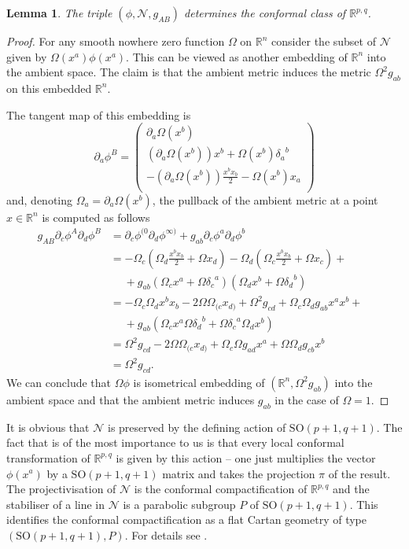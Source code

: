 \documentclass[final]{birkmult}
\newtheorem{lemma}[theorem]{Lemma}
\theoremstyle{definition}
\theoremstyle{remark}
\numberwithin{equation}{section}
\newcommand{\p}[1]{\partial_{#1}}
\newcommand{\R}{\mathbb{R}^{p,q}}
\newcommand{\aSO}{\mathrm{SO}(p+1,q+1)}
\begin{document}
  \begin{lemma}
    The triple $(\phi,\mathcal{N},g_{AB})$ determines the conformal class of $\R$.
   \end{lemma}
  \begin{proof}
    For any smooth nowhere zero function $\Omega$ on $\mathbb{R}^n$ consider the subset of $\mathcal{N}$ given by $\Omega(x^a)\phi(x^a)$. This can be viewed as another embedding of $\mathbb{R}^n$ into the ambient space. The claim is that the ambient metric induces the metric $\Omega^2g_{ab}$ on this embedded $\mathbb{R}^n$.

    The tangent map of this embedding is
    \[
      \partial_a \phi^B = \begin{pmatrix} \partial_a \Omega(x^b)\\(\partial_a \Omega(x^b))x^b + \Omega(x^b){\delta_a}^b\\ -(\partial_a\Omega(x^b))\frac{x^bx_b}{2} - \Omega(x^b)x_a\\ \end{pmatrix}
    \]
    and, denoting $\Omega_a=\p{a}\Omega(x^b)$, the pullback of the ambient metric at a point $x\in \mathbb{R}^n$ is computed as follows
    \begin{align*}
	    g_{AB}\partial_c \phi^A \partial_d \phi^B & = \partial_c \phi^{(0}\partial_d \phi^{\infty)} + g_{ab} \partial_c \phi^a \partial_d \phi^b&\\
						      & = -\Omega_c(\Omega_d \tfrac{x^bx_b}{2} + \Omega x_d) - \Omega_d(\Omega_c \tfrac{x^bx_b}{2} + \Omega x_c) +\\
							    &\quad\; + g_{ab}(\Omega_c x^a + \Omega {\delta_c}^a)(\Omega_d x^b + \Omega {\delta_d}^b)\\
						      & = -\Omega_c\Omega_dx^bx_b - 2\Omega \Omega_{(c}x_{d)} + \Omega^2 g_{cd} + \Omega_c\Omega_dg_{ab}x^ax^b +\\
							    & \quad\; + g_{ab}(\Omega_cx^a\Omega{\delta_d}^b + \Omega{\delta_c}^a\Omega_dx^b)\\
						      & = \Omega^2 g_{cd} - 2\Omega\Omega_{(c}x_{d)} + \Omega_c\Omega g_{ad}x^a + \Omega \Omega_d g_{cb}x^b\\
						      & = \Omega^2 g_{cd}.
	  \end{align*}
    We can conclude that $\Omega\phi$ is isometrical embedding of $(\mathbb{R}^n,\Omega^2 g_{ab})$ into the ambient space and that the ambient metric induces $g_{ab}$ in the case of $\Omega = 1$. 
  \end{proof}
  
  It is obvious that $\mathcal{N}$ is preserved by the defining action of $\aSO$. The fact that is of the most importance to us is that every local conformal transformation of $\R$ is given by this action -- one just multiplies the vector $\phi(x^a)$ by a $\aSO$ matrix and takes the projection $\pi$ of the result. The projectivisation of $\mathcal{N}$ is the conformal compactification of $\R$ and the stabiliser of a line in $\mathcal{N}$ is a parabolic subgroup $P$ of $\aSO$. This identifies the conformal compactification as a flat Cartan geometry of type $(\aSO,P)$. For details see \cite{slovk_invariant_1992}. %
\end{document}
